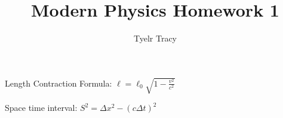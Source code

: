 \documentclass{article}
\title{Modern Physics Homework 1}
\author{Tyelr Tracy}
\begin{document}
Length Contraction Formula: $\ell = \ell_0 \sqrt{1 - \frac{v^2}{c^2}}$

Space time interval: $S^2 = \Delta x^2 - (c \Delta t)^2$
\end{document}
